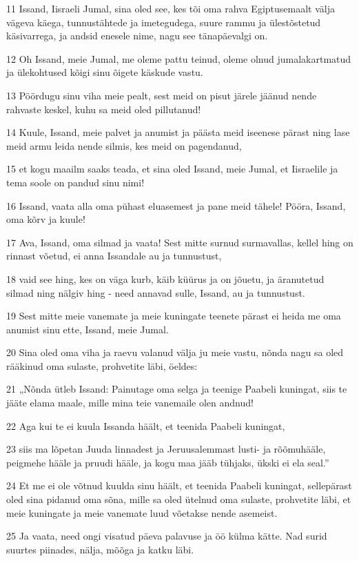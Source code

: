 \par 11 Issand, Iisraeli Jumal, sina oled see, kes tõi oma rahva Egiptusemaalt välja vägeva käega, tunnustähtede ja imetegudega, suure rammu ja ülestõstetud käsivarrega, ja andsid enesele nime, nagu see tänapäevalgi on.
\par 12 Oh Issand, meie Jumal, me oleme pattu teinud, oleme olnud jumalakartmatud ja ülekohtused kõigi sinu õigete käskude vastu.
\par 13 Pöördugu sinu viha meie pealt, sest meid on pisut järele jäänud nende rahvaste keskel, kuhu sa meid oled pillutanud!
\par 14 Kuule, Issand, meie palvet ja anumist ja päästa meid iseenese pärast ning lase meid armu leida nende silmis, kes meid on pagendanud,
\par 15 et kogu maailm saaks teada, et sina oled Issand, meie Jumal, et Iisraelile ja tema soole on pandud sinu nimi!
\par 16 Issand, vaata alla oma pühast eluasemest ja pane meid tähele! Pööra, Issand, oma kõrv ja kuule!
\par 17 Ava, Issand, oma silmad ja vaata! Sest mitte surnud surmavallas, kellel hing on rinnast võetud, ei anna Issandale au ja tunnustust,
\par 18 vaid see hing, kes on väga kurb, käib küürus ja on jõuetu, ja äranutetud silmad ning nälgiv hing - need annavad sulle, Issand, au ja tunnustust.
\par 19 Sest mitte meie vanemate ja meie kuningate teenete pärast ei heida me oma anumist sinu ette, Issand, meie Jumal.
\par 20 Sina oled oma viha ja raevu valanud välja ju meie vastu, nõnda nagu sa oled rääkinud oma sulaste, prohvetite läbi, öeldes:
\par 21 „Nõnda ütleb Issand: Painutage oma selga ja teenige Paabeli kuningat, siis te jääte elama maale, mille mina teie vanemaile olen andnud!
\par 22 Aga kui te ei kuula Issanda häält, et teenida Paabeli kuningat,
\par 23 siis ma lõpetan Juuda linnadest ja Jeruusalemmast lusti- ja rõõmuhääle, peigmehe hääle ja pruudi hääle, ja kogu maa jääb tühjaks, ükski ei ela seal.”
\par 24 Et me ei ole võtnud kuulda sinu häält, et teenida Paabeli kuningat, sellepärast oled sina pidanud oma sõna, mille sa oled ütelnud oma sulaste, prohvetite läbi, et meie kuningate ja meie vanemate luud võetakse nende asemeist.
\par 25 Ja vaata, need ongi visatud päeva palavuse ja öö külma kätte. Nad surid suurtes piinades, nälja, mõõga ja katku läbi.
